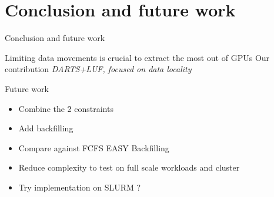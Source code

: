 \documentclass{libs/ufc_format}
\begin{document}
{\section{Conclusion and future work}
\begin{frame}{Conclusion and future work}
\begin{block}{Limiting data movements is crucial to extract the most out of GPUs}
	Our contribution \MVRightarrow{}
	\emph{DARTS+LUF, focused on data locality}
\end{block}
	\begin{exampleblock}{Future work}
		\begin{itemize}
		\item Combine the 2 constraints
		\item Add backfilling
		\item Compare against FCFS EASY Backfilling
		\item Reduce complexity to test on full scale workloads and cluster
		\item Try implementation on SLURM ?
		\end{itemize}
	\end{exampleblock}
\end{frame}

}
\end{document}
